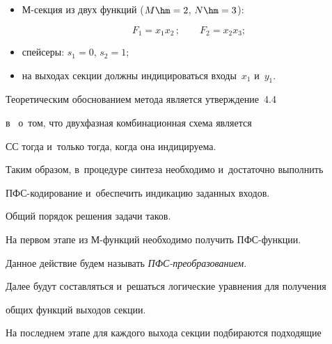    \begin{itemize}


   \item М-секция из двух функций ($M\hm = 2$, $N\hm = 3$):


   \begin{equation*}


   F_1 = x_1 x_2\,;\qquad


   F_2 = x_2 x_3;


   \end{equation*}


   \item  спейсеры: $s_1 = 0$, $s_2 = 1$;


   \item  на выходах секции должны индицироваться входы~$x_1$ и~$y_1$.


   \end{itemize}


   


   Теоретическим обоснованием метода является утверждение~4.4 


в~\cite[с.~92]{1-pl} о~том, что двухфазная комбинационная схема является 


СС тогда и~только тогда, когда она индицируема.


   


   Таким образом, в~процедуре синтеза необходимо и~достаточно выполнить 


ПФС-ко\-ди\-ро\-ва\-ние и~обеспечить индикацию заданных входов.


   


   Общий порядок решения задачи таков.


   


   На первом этапе из М-функ\-ций необходимо получить ПФС-функ\-ции. 


Данное действие будем называть \textit{ПФС-пре\-обра\-зо\-ва\-нием}.


   


   Далее будут составляться и~решаться логические уравнения для получения 


общих функций выходов секции.


   


   На последнем этапе для каждого выхода секции подбираются подходящие 


